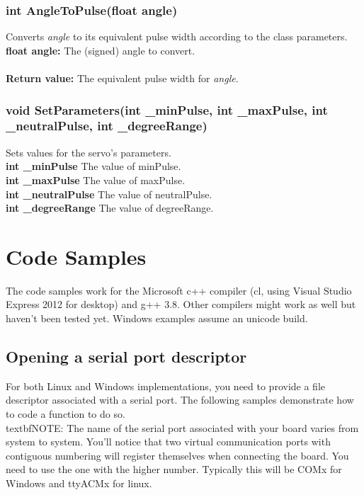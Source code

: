 \documentclass[letterpaper]{book}
\begin{document}
\subsection{int AngleToPulse(float angle)}
Converts \textit{angle} to its equivalent pulse width according to the class parameters.\\
\textbf{float angle: }The (signed) angle to convert.\\\\
\textbf{Return value: }The equivalent pulse width for \textit{angle}.
\subsection{void SetParameters(int \_minPulse, int \_maxPulse, int \_neutralPulse, int \_degreeRange)}
Sets values for the servo's parameters.\\
\textbf{int \_minPulse} The value of minPulse.\\
\textbf{int \_maxPulse} The value of maxPulse.\\
\textbf{int \_neutralPulse} The value of neutralPulse.\\
\textbf{int \_degreeRange} The value of degreeRange.




\chapter{Code Samples}
The code samples work for the Microsoft c++ compiler (cl, using Visual Studio Express 2012 for desktop) and g++ 3.8. Other compilers might work as well but haven't been tested yet. Windows examples assume an unicode build. \\
\section{Opening a serial port descriptor}
For both Linux and Windows implementations, you need to provide a file descriptor associated with a serial port. The following samples demonstrate how to code a function to do so.\\
textbf{NOTE: }The name of the serial port associated with your board varies from system to system. You'll notice that two virtual communication ports with contiguous numbering will register themselves when connecting the board. You need to use the one with the higher number. Typically this will be COMx for Windows and ttyACMx for linux.\\
\end{document}
